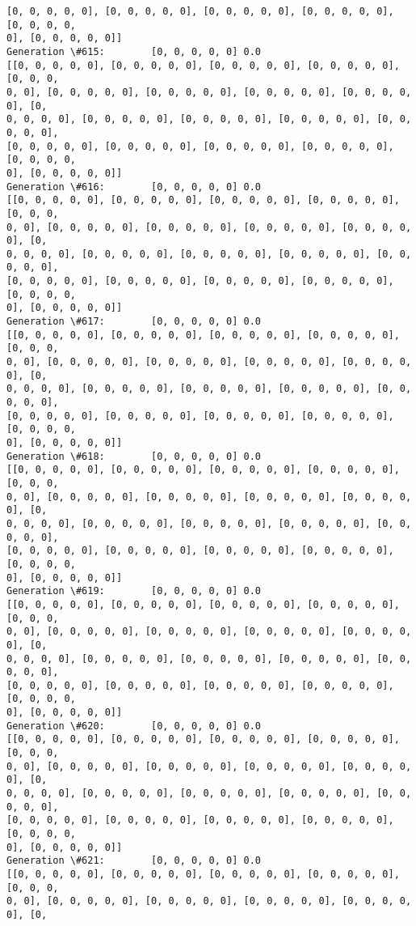\documentclass[11pt]{article}
\begin{document}
\begin{Verbatim}[commandchars=\\\{\}]
[0, 0, 0, 0, 0], [0, 0, 0, 0, 0], [0, 0, 0, 0, 0], [0, 0, 0, 0, 0], [0, 0, 0, 0,
0], [0, 0, 0, 0, 0]]
Generation \#615:        [0, 0, 0, 0, 0] 0.0
[[0, 0, 0, 0, 0], [0, 0, 0, 0, 0], [0, 0, 0, 0, 0], [0, 0, 0, 0, 0], [0, 0, 0,
0, 0], [0, 0, 0, 0, 0], [0, 0, 0, 0, 0], [0, 0, 0, 0, 0], [0, 0, 0, 0, 0], [0,
0, 0, 0, 0], [0, 0, 0, 0, 0], [0, 0, 0, 0, 0], [0, 0, 0, 0, 0], [0, 0, 0, 0, 0],
[0, 0, 0, 0, 0], [0, 0, 0, 0, 0], [0, 0, 0, 0, 0], [0, 0, 0, 0, 0], [0, 0, 0, 0,
0], [0, 0, 0, 0, 0]]
Generation \#616:        [0, 0, 0, 0, 0] 0.0
[[0, 0, 0, 0, 0], [0, 0, 0, 0, 0], [0, 0, 0, 0, 0], [0, 0, 0, 0, 0], [0, 0, 0,
0, 0], [0, 0, 0, 0, 0], [0, 0, 0, 0, 0], [0, 0, 0, 0, 0], [0, 0, 0, 0, 0], [0,
0, 0, 0, 0], [0, 0, 0, 0, 0], [0, 0, 0, 0, 0], [0, 0, 0, 0, 0], [0, 0, 0, 0, 0],
[0, 0, 0, 0, 0], [0, 0, 0, 0, 0], [0, 0, 0, 0, 0], [0, 0, 0, 0, 0], [0, 0, 0, 0,
0], [0, 0, 0, 0, 0]]
Generation \#617:        [0, 0, 0, 0, 0] 0.0
[[0, 0, 0, 0, 0], [0, 0, 0, 0, 0], [0, 0, 0, 0, 0], [0, 0, 0, 0, 0], [0, 0, 0,
0, 0], [0, 0, 0, 0, 0], [0, 0, 0, 0, 0], [0, 0, 0, 0, 0], [0, 0, 0, 0, 0], [0,
0, 0, 0, 0], [0, 0, 0, 0, 0], [0, 0, 0, 0, 0], [0, 0, 0, 0, 0], [0, 0, 0, 0, 0],
[0, 0, 0, 0, 0], [0, 0, 0, 0, 0], [0, 0, 0, 0, 0], [0, 0, 0, 0, 0], [0, 0, 0, 0,
0], [0, 0, 0, 0, 0]]
Generation \#618:        [0, 0, 0, 0, 0] 0.0
[[0, 0, 0, 0, 0], [0, 0, 0, 0, 0], [0, 0, 0, 0, 0], [0, 0, 0, 0, 0], [0, 0, 0,
0, 0], [0, 0, 0, 0, 0], [0, 0, 0, 0, 0], [0, 0, 0, 0, 0], [0, 0, 0, 0, 0], [0,
0, 0, 0, 0], [0, 0, 0, 0, 0], [0, 0, 0, 0, 0], [0, 0, 0, 0, 0], [0, 0, 0, 0, 0],
[0, 0, 0, 0, 0], [0, 0, 0, 0, 0], [0, 0, 0, 0, 0], [0, 0, 0, 0, 0], [0, 0, 0, 0,
0], [0, 0, 0, 0, 0]]
Generation \#619:        [0, 0, 0, 0, 0] 0.0
[[0, 0, 0, 0, 0], [0, 0, 0, 0, 0], [0, 0, 0, 0, 0], [0, 0, 0, 0, 0], [0, 0, 0,
0, 0], [0, 0, 0, 0, 0], [0, 0, 0, 0, 0], [0, 0, 0, 0, 0], [0, 0, 0, 0, 0], [0,
0, 0, 0, 0], [0, 0, 0, 0, 0], [0, 0, 0, 0, 0], [0, 0, 0, 0, 0], [0, 0, 0, 0, 0],
[0, 0, 0, 0, 0], [0, 0, 0, 0, 0], [0, 0, 0, 0, 0], [0, 0, 0, 0, 0], [0, 0, 0, 0,
0], [0, 0, 0, 0, 0]]
Generation \#620:        [0, 0, 0, 0, 0] 0.0
[[0, 0, 0, 0, 0], [0, 0, 0, 0, 0], [0, 0, 0, 0, 0], [0, 0, 0, 0, 0], [0, 0, 0,
0, 0], [0, 0, 0, 0, 0], [0, 0, 0, 0, 0], [0, 0, 0, 0, 0], [0, 0, 0, 0, 0], [0,
0, 0, 0, 0], [0, 0, 0, 0, 0], [0, 0, 0, 0, 0], [0, 0, 0, 0, 0], [0, 0, 0, 0, 0],
[0, 0, 0, 0, 0], [0, 0, 0, 0, 0], [0, 0, 0, 0, 0], [0, 0, 0, 0, 0], [0, 0, 0, 0,
0], [0, 0, 0, 0, 0]]
Generation \#621:        [0, 0, 0, 0, 0] 0.0
[[0, 0, 0, 0, 0], [0, 0, 0, 0, 0], [0, 0, 0, 0, 0], [0, 0, 0, 0, 0], [0, 0, 0,
0, 0], [0, 0, 0, 0, 0], [0, 0, 0, 0, 0], [0, 0, 0, 0, 0], [0, 0, 0, 0, 0], [0,

\end{Verbatim}
\end{document}
